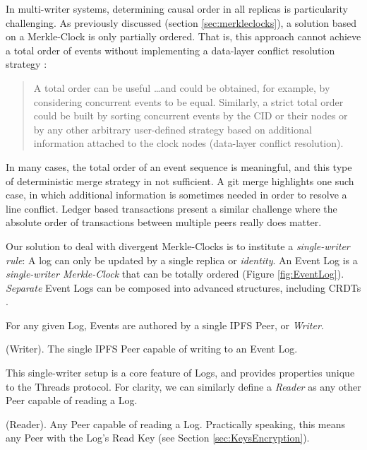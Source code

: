\documentclass{textile}
\begin{document}
In multi-writer systems, determining causal order in all replicas is particularity challenging. As previously discussed (section \ref{sec:merkleclocks}), a solution based on a Merkle-Clock is only partially ordered. That is, this approach cannot achieve a total order of events without implementing a data-layer conflict resolution strategy \cite{sanjuanMerkleCRDTs2019}:

\begin{quote}
A total order can be useful \dots and could be obtained, for example, by considering concurrent events to be equal. Similarly, a strict total order could be built by sorting concurrent events by the CID or their nodes or by any other arbitrary user-defined strategy based on additional information attached to the clock nodes (data-layer conflict resolution).
\end{quote}

In many cases, the total order of an event sequence is meaningful, and this type of deterministic merge strategy in not sufficient. A git merge highlights one such case, in which additional information is sometimes needed in order to resolve a line conflict. Ledger based transactions present a similar challenge where the absolute order of transactions between multiple peers really does matter.

Our solution to deal with divergent Merkle-Clocks is to institute a \emph{single-writer rule}: A log can only be updated by a single replica or \emph{identity}. An Event Log is a \emph{single-writer Merkle-Clock} that can be totally ordered (Figure \ref{fig:EventLog}). \emph{Separate} Event Logs can be composed into advanced structures, including CRDTs \cite{enesSingleWriterPrincipleCRDT2017}.

For any given Log, Events are authored by a single IPFS Peer, or \emph{Writer}.

\begin{definition}
(Writer). The single IPFS Peer capable of writing to an Event Log.
\end{definition}

This single-writer setup is a core feature of Logs, and provides properties unique to the Threads protocol. For clarity, we can similarly define a \emph{Reader} as any other Peer capable of reading a Log.

\begin{definition}
(Reader). Any Peer capable of reading a Log. Practically speaking, this means any Peer with the Log's Read Key (see Section  \ref{sec:KeysEncryption}).
\end{definition}
\end{document}
